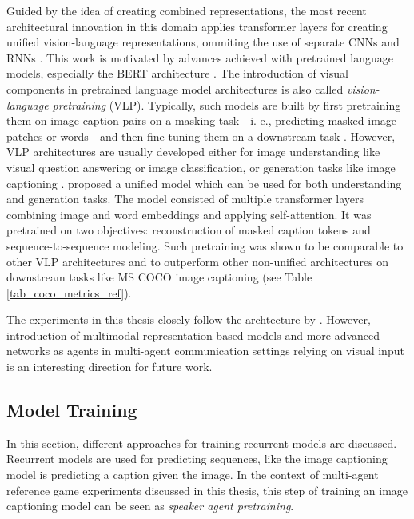 Guided by the idea of creating combined representations, the most recent architectural innovation in this domain applies transformer layers for creating unified vision-language representations, ommiting the use of separate CNNs and RNNs \parencite{vaswani2017attention, zhou2019unified}. This work is motivated by advances achieved with pretrained language models, especially the BERT architecture \parencite{devlin2018bert}. The introduction of visual components in pretrained language model architectures is also called \textit{vision-language pretraining} (VLP). Typically, such models are built by first pretraining them on image-caption pairs on a masking task---i. e., predicting masked image patches or words---and then fine-tuning them on a downstream task \parencite[e.~g.,][]{lu2019vilbert}.
However, VLP architectures are usually developed either for image understanding like visual question answering or image classification, or generation tasks like image captioning \parencite{zhou2019unified}. 
\cite{zhou2019unified} proposed a unified model which can be used for both understanding and generation tasks. 
The model consisted of multiple transformer layers combining image and word embeddings and applying self-attention. It was pretrained on two objectives: reconstruction of masked caption tokens and sequence-to-sequence modeling. Such pretraining was shown to be comparable to other VLP architectures and to outperform other non-unified architectures on downstream tasks like MS COCO image captioning (see Table \ref{tab_coco_metrics_ref}). 

The experiments in this thesis closely follow the archtecture by \cite{vinyals2015show}. However, introduction of multimodal representation based models and more advanced networks as agents in multi-agent communication settings relying on visual input is an interesting direction for future work. 

\subsection{Model Training}
\label{model_pretraining}
In this section, different approaches for training recurrent models are discussed. Recurrent models are used for predicting sequences, like the image captioning model is predicting a caption given the image. In the context of multi-agent reference game experiments discussed in this thesis, this step of training an image captioning model can be seen as \emph{speaker agent pretraining}.

